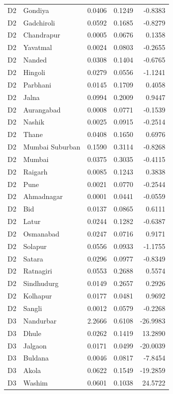 \documentclass[11pt,a4paper]{report}
\begin{document}
\begin{longtable}{l>{\raggedright\arraybackslash}p{5cm}rrr}
D2 & Gondiya & 0.0406 & 0.1249 & -0.8383 \\
D2 & Gadchiroli & 0.0592 & 0.1685 & -0.8279 \\
D2 & Chandrapur & 0.0005 & 0.0676 & 0.1358 \\
D2 & Yavatmal & 0.0024 & 0.0803 & -0.2655 \\
D2 & Nanded & 0.0308 & 0.1404 & -0.6765 \\
D2 & Hingoli & 0.0279 & 0.0556 & -1.1241 \\
D2 & Parbhani & 0.0145 & 0.1709 & 0.4058 \\
D2 & Jalna & 0.0994 & 0.2009 & 0.9447 \\
D2 & Aurangabad & 0.0008 & 0.0771 & -0.1539 \\
D2 & Nashik & 0.0025 & 0.0915 & -0.2514 \\
D2 & Thane & 0.0408 & 0.1650 & 0.6976 \\
D2 & Mumbai Suburban & 0.1590 & 0.3114 & -0.8268 \\
D2 & Mumbai & 0.0375 & 0.3035 & -0.4115 \\
D2 & Raigarh & 0.0085 & 0.1243 & 0.3838 \\
D2 & Pune & 0.0021 & 0.0770 & -0.2544 \\
D2 & Ahmadnagar & 0.0001 & 0.0441 & -0.0559 \\
D2 & Bid & 0.0137 & 0.0865 & 0.6111 \\
D2 & Latur & 0.0244 & 0.1282 & -0.6387 \\
D2 & Osmanabad & 0.0247 & 0.0716 & 0.9171 \\
D2 & Solapur & 0.0556 & 0.0933 & -1.1755 \\
D2 & Satara & 0.0296 & 0.0977 & -0.8349 \\
D2 & Ratnagiri & 0.0553 & 0.2688 & 0.5574 \\
D2 & Sindhudurg & 0.0149 & 0.2657 & 0.2926 \\
D2 & Kolhapur & 0.0177 & 0.0481 & 0.9692 \\
D2 & Sangli & 0.0012 & 0.0579 & -0.2268 \\
D3 & Nandurbar & 2.2666 & 0.6108 & -26.9983 \\
D3 & Dhule & 0.0262 & 0.1419 & 13.2890 \\
D3 & Jalgaon & 0.0171 & 0.0499 & -20.0039 \\
D3 & Buldana & 0.0046 & 0.0817 & -7.8454 \\
D3 & Akola & 0.0622 & 0.1549 & -19.2859 \\
D3 & Washim & 0.0601 & 0.1038 & 24.5722 \\

\end{longtable}
\end{document}
